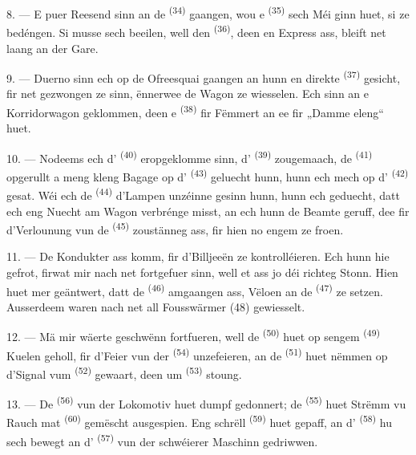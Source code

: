 8. --- E puer Reesend sinn an de  \textsuperscript{(34)} gaangen, wou
e  \textsuperscript{(35)} sech Méi ginn huet, si ze bedéngen. Si musse
sech beeilen, well den  \textsuperscript{(36)}, deen en Express ass,
bleift net laang an der Gare.

9. --- Duerno sinn ech op de Ofreesquai gaangen an hunn en direkte 
\textsuperscript{(37)} gesicht, fir net gezwongen ze sinn, ënnerwee de Wagon ze
wiesselen. Ech sinn an e Korridorwagon geklommen, deen e 
\textsuperscript{(38)} fir Fëmmert an ee fir „Damme eleng“ huet.

\VUsaut{3.0mm}

10. --- Nodeems ech d' \textsuperscript{(40)} eropgeklomme sinn,
d' \textsuperscript{(39)} zougemaach, de 
\textsuperscript{(41)} opgerullt a meng kleng Bagage op d'
\textsuperscript{(43)} geluecht hunn, hunn ech mech op d'
\textsuperscript{(42)} gesat. Wéi ech de  \textsuperscript{(44)}
d'Lampen unzéinne gesinn hunn, hunn ech geduecht, datt ech eng Nuecht am Wagon
verbrénge misst, an ech hunn de Beamte geruff, dee fir d'Verlounung vun de
 \textsuperscript{(45)} zoustänneg ass, fir hien no engem ze froen.

11. --- De Kondukter ass komm, fir d'Billjeeën ze kontrolléieren. Ech hunn hie
gefrot, firwat mir nach net fortgefuer sinn, well et ass jo déi richteg Stonn. Hien
huet mer geäntwert, datt de  \textsuperscript{(46)} amgaangen ass,
Vëloen an de  \textsuperscript{(47)} ze setzen. Ausserdeem waren nach
net all Fousswärmer (48) gewiesselt.

12. --- Mä mir wäerte geschwënn fortfueren, well de 
\textsuperscript{(50)} huet op sengem  \textsuperscript{(49)} Kuelen
geholl, fir d'Feier vun der  \textsuperscript{(54)} unzefeieren, an
de  \textsuperscript{(51)} huet nëmmen op d'Signal vum
 \textsuperscript{(52)} gewaart, deen um
 \textsuperscript{(53)} stoung.

13. --- De  \textsuperscript{(56)} vun der Lokomotiv huet dumpf
gedonnert; de  \textsuperscript{(55)} huet Strëmm vu Rauch mat
 \textsuperscript{(60)} gemëscht ausgespien. Eng schrëll 
\textsuperscript{(59)} huet gepaff, an d' \textsuperscript{(58)} hu
sech bewegt an d' \textsuperscript{(57)} vun der schwéierer Maschinn
gedriwwen.

